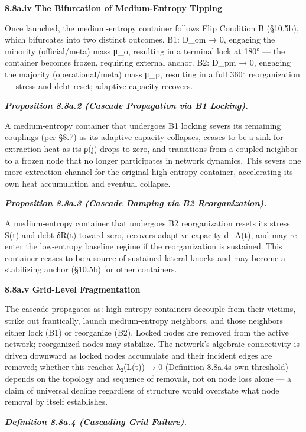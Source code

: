 \documentclass[
]{article}
\begin{document}
\textbf{8.8a.iv The Bifurcation of Medium-Entropy Tipping}

Once launched, the medium-entropy container follows Flip Condition B
(§10.5b), which bifurcates into two distinct outcomes. B1: D\_om → 0,
engaging the minority (official/meta) mass μ\_o, resulting in a terminal
lock at 180° --- the container becomes frozen, requiring external
anchor. B2: D\_pm → 0, engaging the majority (operational/meta) mass
μ\_p, resulting in a full 360° reorganization --- stress and debt reset;
adaptive capacity recovers.

\emph{\textbf{Proposition 8.8a.2 (Cascade Propagation via B1 Locking).}}

A medium-entropy container that undergoes B1 locking severs its
remaining couplings (per §8.7) as its adaptive capacity collapses,
ceases to be a sink for extraction heat as its ρ(j) drops to zero, and
transitions from a coupled neighbor to a frozen node that no longer
participates in network dynamics. This severs one more extraction
channel for the original high-entropy container, accelerating its own
heat accumulation and eventual collapse.

\emph{\textbf{Proposition 8.8a.3 (Cascade Damping via B2
Reorganization).}}

A medium-entropy container that undergoes B2 reorganization resets its
stress S(t) and debt δR(t) toward zero, recovers adaptive capacity
d\_A(t), and may re-enter the low-entropy baseline regime if the
reorganization is sustained. This container ceases to be a source of
sustained lateral knocks and may become a stabilizing anchor (§10.5b)
for other containers.

\textbf{8.8a.v Grid-Level Fragmentation}

The cascade propagates as: high-entropy containers decouple from their
victims, strike out frantically, launch medium-entropy neighbors, and
those neighbors either lock (B1) or reorganize (B2). Locked nodes are
removed from the active network; reorganized nodes may stabilize. The
network's algebraic connectivity is driven downward as locked nodes
accumulate and their incident edges are removed; whether this reaches
λ₂(L(t)) → 0 (Definition 8.8a.4\textquotesingle s own threshold) depends
on the topology and sequence of removals, not on node loss alone --- a
claim of universal decline regardless of structure would overstate what
node removal by itself establishes.

\emph{\textbf{Definition 8.8a.4 (Cascading Grid Failure).}}
\end{document}
